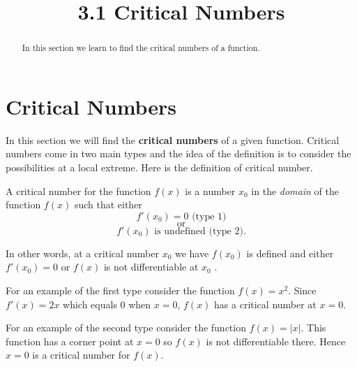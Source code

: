 \documentclass{ximera}
\title{3.1 Critical Numbers}
\begin{document}
\begin{abstract}
In this section we learn to find the critical numbers of a function.
\end{abstract}

\maketitle









\section{Critical Numbers}

In this section we will find the {\bf critical numbers} of a given function. 
Critical numbers come in two main types and the idea of the definition is to consider the possibilities at a local extreme. Here is the definition of  critical number.  \\



\begin{definition}
A critical number for the function $f(x)$ is a number 
$x_0$ in the {\it domain} of the function $f(x)$ such that either
\[f'(x_0) = 0 \text{  (type 1)}\]
\[ \text{or} \]
\[f'(x_0)  \text{   is undefined  (type 2)}.\]
\end{definition}
In other words, at a critical number $x_0$ we have  $f(x_0)$ is defined and either $f'(x_0) = 0$ or
$f(x)$ is not differentiable at $x_0$ .

For an example of the first type  consider the function $f(x) = x^2$.   
Since $f'(x) = 2x$ which equals 0 when $x = 0$,
$f(x)$ has a critical number at $x = 0$.

For an example of the second type consider the function $f(x) = |x|$. This function has a corner point at $x = 0$
so $f(x)$ is not differentiable there. Hence $x=0$ is a critical number for $f(x)$.
\end{document}
